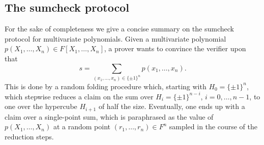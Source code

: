 \documentclass[11pt]{article}
\theoremstyle{definition}
\theoremstyle{remark}
\begin{document}
\subsection{The sumcheck protocol}

For the sake of completeness we give a concise summary on the sumcheck protocol \cite{sumcheck} for multivariate polynomials.
Given a multivariate polynomial $p(X_1,\ldots, X_n)\in F[X_1,\ldots, X_n]$, a prover wants to convince the verifier upon that
\begin{equation*}
s = \sum_{(x_1,\ldots, x_n) \in \{\pm 1\}^n} p(x_1, \ldots, x_n).
\end{equation*}
This is done by a random folding procedure which, starting with $H_0=\{\pm 1\}^n$, which stepwise reduces a claim on the sum over $H_i = \{\pm 1\}^{n-i}$, $i=0,\ldots, n-1$, to one over the hypercube $H_{i+1}$ of half the size. 
Eventually, one ends up with a claim over a single-point sum, which is paraphrased as the value of $p(X_1,\ldots, X_n)$ at a random point $(r_1,\ldots, r_n)\in F^n$ sampled in the course of the reduction steps.

 
\end{document}
